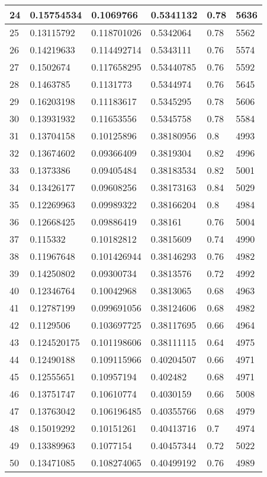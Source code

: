 \begin{longtable}{|l|l|l|l|l|l|}
24 & 0.15754534 & 0.1069766 & 0.5341132 & 0.78 & 5636 \\ \hline 
25 & 0.13115792 & 0.118701026 & 0.5342064 & 0.78 & 5562 \\ \hline 
26 & 0.14219633 & 0.114492714 & 0.5343111 & 0.76 & 5574 \\ \hline 
27 & 0.1502674 & 0.117658295 & 0.53440785 & 0.76 & 5592 \\ \hline 
28 & 0.1463785 & 0.1131773 & 0.5344974 & 0.76 & 5645 \\ \hline 
29 & 0.16203198 & 0.11183617 & 0.5345295 & 0.78 & 5606 \\ \hline 
30 & 0.13931932 & 0.11653556 & 0.5345758 & 0.78 & 5584 \\ \hline 
31 & 0.13704158 & 0.10125896 & 0.38180956 & 0.8 & 4993 \\ \hline 
32 & 0.13674602 & 0.09366409 & 0.3819304 & 0.82 & 4996 \\ \hline 
33 & 0.1373386 & 0.09405484 & 0.38183534 & 0.82 & 5001 \\ \hline 
34 & 0.13426177 & 0.09608256 & 0.38173163 & 0.84 & 5029 \\ \hline 
35 & 0.12269963 & 0.09989322 & 0.38166204 & 0.8 & 4984 \\ \hline 
36 & 0.12668425 & 0.09886419 & 0.38161 & 0.76 & 5004 \\ \hline 
37 & 0.115332 & 0.10182812 & 0.3815609 & 0.74 & 4990 \\ \hline 
38 & 0.11967648 & 0.101426944 & 0.38146293 & 0.76 & 4982 \\ \hline 
39 & 0.14250802 & 0.09300734 & 0.3813576 & 0.72 & 4992 \\ \hline 
40 & 0.12346764 & 0.10042968 & 0.3813065 & 0.68 & 4963 \\ \hline 
41 & 0.12787199 & 0.099691056 & 0.38124606 & 0.68 & 4982 \\ \hline 
42 & 0.1129506 & 0.103697725 & 0.38117695 & 0.66 & 4964 \\ \hline 
43 & 0.124520175 & 0.101198606 & 0.38111115 & 0.64 & 4975 \\ \hline 
44 & 0.12490188 & 0.109115966 & 0.40204507 & 0.66 & 4971 \\ \hline 
45 & 0.12555651 & 0.10957194 & 0.402482 & 0.68 & 4971 \\ \hline 
46 & 0.13751747 & 0.10610774 & 0.4030159 & 0.66 & 5008 \\ \hline 
47 & 0.13763042 & 0.106196485 & 0.40355766 & 0.68 & 4979 \\ \hline 
48 & 0.15019292 & 0.10151261 & 0.40413716 & 0.7 & 4974 \\ \hline 
49 & 0.13389963 & 0.1077154 & 0.40457344 & 0.72 & 5022 \\ \hline 
50 & 0.13471085 & 0.108274065 & 0.40499192 & 0.76 & 4989 \\ \hline 
\end{longtable}